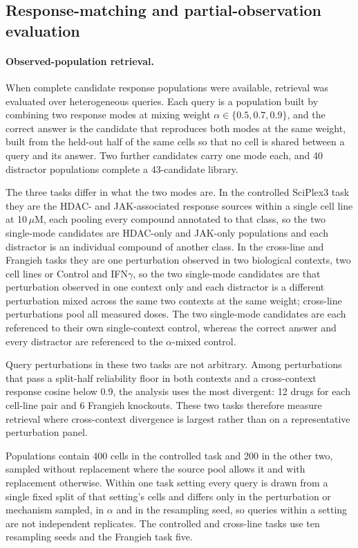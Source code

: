 \documentclass[11pt,letterpaper]{article}
\begin{document}
\subsection*{Response-matching and partial-observation evaluation}

\paragraph{Observed-population retrieval.}
When complete candidate response populations were available, retrieval was evaluated over
heterogeneous queries. Each query is a population built by combining two response modes at mixing
weight $\alpha\in\{0.5,0.7,0.9\}$, and the correct answer is the candidate that reproduces both
modes at the same weight, built from the held-out half of the same cells so that no cell is shared
between a query and its answer. Two further candidates carry one mode each, and 40 distractor
populations complete a 43-candidate library.

The three tasks differ in what the two modes are. In the controlled SciPlex3 task they are the
HDAC- and JAK-associated response sources within a single cell line at 10\,$\mu$M, each pooling
every compound annotated to that class, so the two single-mode candidates are HDAC-only and
JAK-only populations and each distractor is an individual compound of another class. In the
cross-line and Frangieh tasks they are one perturbation observed in two biological contexts, two
cell lines or Control and IFN$\gamma$, so the two single-mode candidates are that perturbation
observed in one context only and each distractor is a different perturbation mixed across the same
two contexts at the same weight; cross-line perturbations pool all measured doses. The two
single-mode candidates are each referenced to their own single-context control, whereas the correct
answer and every distractor are referenced to the $\alpha$-mixed control.

Query perturbations in these two tasks are not arbitrary. Among perturbations that pass a
split-half reliability floor in both contexts and a cross-context response cosine below 0.9, the
analysis uses the most divergent: 12 drugs for each cell-line pair and 6 Frangieh knockouts. These
two tasks therefore measure retrieval where cross-context divergence is largest rather than on a
representative perturbation panel.

Populations contain 400 cells in the controlled task and 200 in the other two, sampled without
replacement where the source pool allows it and with replacement otherwise. Within one task
setting every query is drawn from a single fixed split of that setting's cells and differs only in
the perturbation or mechanism sampled, in $\alpha$ and in the resampling seed, so queries within a
setting are not independent replicates. The controlled and cross-line tasks use ten resampling
seeds and the Frangieh task five.
\end{document}
